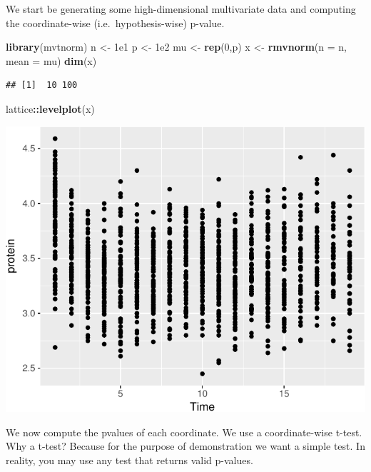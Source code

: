 \documentclass[]{book}
\newenvironment{Shaded}{\begin{snugshade}}{\end{snugshade}}
\newcommand{\KeywordTok}[1]{\textcolor[rgb]{0.13,0.29,0.53}{\textbf{#1}}}
\newcommand{\DataTypeTok}[1]{\textcolor[rgb]{0.13,0.29,0.53}{#1}}
\newcommand{\DecValTok}[1]{\textcolor[rgb]{0.00,0.00,0.81}{#1}}
\newcommand{\FloatTok}[1]{\textcolor[rgb]{0.00,0.00,0.81}{#1}}
\newcommand{\StringTok}[1]{\textcolor[rgb]{0.31,0.60,0.02}{#1}}
\newcommand{\ControlFlowTok}[1]{\textcolor[rgb]{0.13,0.29,0.53}{\textbf{#1}}}
\newcommand{\OperatorTok}[1]{\textcolor[rgb]{0.81,0.36,0.00}{\textbf{#1}}}
\newcommand{\NormalTok}[1]{#1}
\theoremstyle{definition}
\theoremstyle{definition}
\theoremstyle{definition}
\theoremstyle{remark}
\begin{document}
We start be generating some high-dimensional multivariate data and
computing the coordinate-wise (i.e.~hypothesis-wise) p-value.

\begin{Shaded}
\begin{Highlighting}[]
\KeywordTok{library}\NormalTok{(mvtnorm)}
\NormalTok{n <-}\StringTok{ }\FloatTok{1e1}
\NormalTok{p <-}\StringTok{ }\FloatTok{1e2}
\NormalTok{mu <-}\StringTok{ }\KeywordTok{rep}\NormalTok{(}\DecValTok{0}\NormalTok{,p)}
\NormalTok{x <-}\StringTok{ }\KeywordTok{rmvnorm}\NormalTok{(}\DataTypeTok{n =}\NormalTok{ n, }\DataTypeTok{mean =}\NormalTok{ mu)}
\KeywordTok{dim}\NormalTok{(x)}
\end{Highlighting}
\end{Shaded}

\begin{verbatim}
## [1]  10 100
\end{verbatim}

\begin{Shaded}
\begin{Highlighting}[]
\NormalTok{lattice}\OperatorTok{::}\KeywordTok{levelplot}\NormalTok{(x)}
\end{Highlighting}
\end{Shaded}

\includegraphics[width=0.5\linewidth]{Rcourse_files/figure-latex/unnamed-chunk-229-1}

We now compute the pvalues of each coordinate. We use a coordinate-wise
t-test. Why a t-test? Because for the purpose of demonstration we want a
simple test. In reality, you may use any test that returns valid
p-values.

\begin{Shaded}
\end{Shaded}
\end{document}

